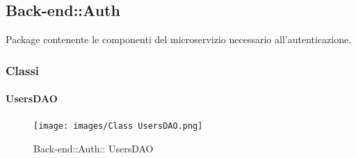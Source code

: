 \subsection{Back-end::Auth}
Package contenente le componenti del microservizio necessario all'autenticazione.
\subsubsection{Classi}
\hypertarget{ UsersDAO_label}{\paragraph{ UsersDAO}}
\begin{figure}[h]
	\centering
	\texttt{[image: images/Class UsersDAO.png]}
	\caption{Back-end::Auth:: UsersDAO}
\end{figure}
